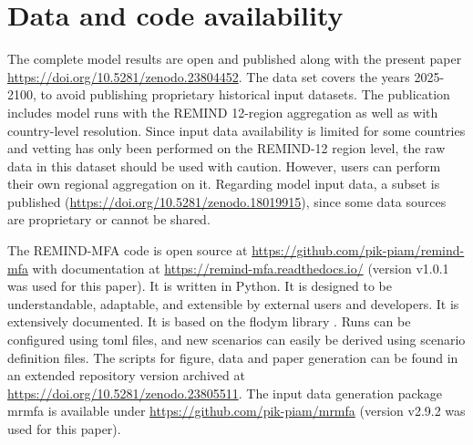 \documentclass[pdflatex]{sn-jnl}
\begin{document}
\section{Data and code availability}\label{sec:availability}
The complete model results are open and published along with the present paper \url{https://doi.org/10.5281/zenodo.23804452}. The data set covers the years 2025-2100, to avoid publishing proprietary historical input datasets. The publication includes model runs with the REMIND 12-region aggregation as well as with country-level resolution. Since input data availability is limited for some countries and vetting has only been performed on the REMIND-12 region level, the raw data in this dataset should be used with caution. However, users can perform their own regional aggregation on it. Regarding model input data, a subset is published (\url{https://doi.org/10.5281/zenodo.18019915}), since some data sources are proprietary or cannot be shared.

The REMIND-MFA code is open source at \url{https://github.com/pik-piam/remind-mfa} with documentation at \url{https://remind-mfa.readthedocs.io/} (version v1.0.1 was used for this paper). It is written in Python. It is designed to be understandable, adaptable, and extensible by external users and developers. It is extensively documented. It is based on the flodym library \parencite{durrwachter2026}. Runs can be configured using toml files, and new scenarios can easily be derived using scenario definition files. The scripts for figure, data and paper generation can be found in an extended repository version archived at \url{https://doi.org/10.5281/zenodo.23805511}. The input data generation package mrmfa is available under \url{https://github.com/pik-piam/mrmfa} (version v2.9.2 was used for this paper).

\printbibliography
\end{document}
